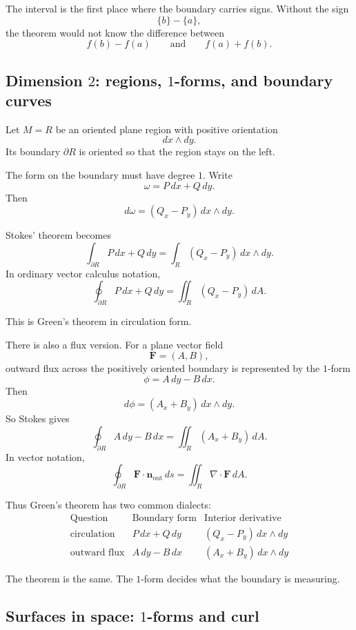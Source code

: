 The interval is the first place where the boundary carries signs.  Without the sign
\[
    \{b\}-\{a\},
\]
the theorem would not know the difference between
\[
    f(b)-f(a)
    \qquad\text{and}\qquad
    f(a)+f(b).
\]

\subsection{Dimension \(2\): regions, \(1\)-forms, and boundary curves}

Let \(M=R\) be an oriented plane region with positive orientation
\[
    dx\wedge dy.
\]
Its boundary \(\partial R\) is oriented so that the region stays on the left.

The form on the boundary must have degree \(1\).  Write
\[
    \omega=P\,dx+Q\,dy.
\]
Then
\[
\boxed{
    d\omega=(Q_x-P_y)\,dx\wedge dy.
}
\]

Stokes' theorem becomes
\[
    \int_{\partial R}P\,dx+Q\,dy
    =
    \int_R (Q_x-P_y)\,dx\wedge dy.
\]
In ordinary vector calculus notation,
\[
\boxed{
    \oint_{\partial R}P\,dx+Q\,dy
    =
    \iint_R (Q_x-P_y)\,dA.
}
\]

This is Green's theorem in circulation form.

There is also a flux version.  For a plane vector field
\[
    \mathbf F=(A,B),
\]
outward flux across the positively oriented boundary is represented by the \(1\)-form
\[
    \phi=A\,dy-B\,dx.
\]
Then
\[
    d\phi=(A_x+B_y)\,dx\wedge dy.
\]
So Stokes gives
\[
\boxed{
    \oint_{\partial R} A\,dy-B\,dx
    =
    \iint_R (A_x+B_y)\,dA.
}
\]
In vector notation,
\[
\boxed{
    \oint_{\partial R}\mathbf F\cdot\mathbf n_{\mathrm{out}}\,ds
    =
    \iint_R \nabla\cdot\mathbf F\,dA.
}
\]

Thus Green's theorem has two common dialects:
\[
\begin{array}{c|c|c}
\text{Question} & \text{Boundary form} & \text{Interior derivative} \\ \hline
\text{circulation} &
P\,dx+Q\,dy &
(Q_x-P_y)\,dx\wedge dy
\\[2mm]
\text{outward flux} &
A\,dy-B\,dx &
(A_x+B_y)\,dx\wedge dy
\end{array}
\]

The theorem is the same.  The \(1\)-form decides what the boundary is measuring.

\subsection{Surfaces in space: \(1\)-forms and curl}

